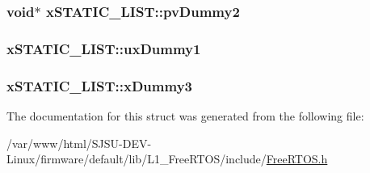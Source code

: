 \subsubsection[{\texorpdfstring{pv\+Dummy2}{pvDummy2}}]{\setlength{\rightskip}{0pt plus 5cm}void$\ast$ x\+S\+T\+A\+T\+I\+C\+\_\+\+L\+I\+S\+T\+::pv\+Dummy2}\hypertarget{structxSTATIC__LIST_a681e588716be5f49fe8e9eb73e8f280e}{}\label{structxSTATIC__LIST_a681e588716be5f49fe8e9eb73e8f280e}
\subsubsection[{\texorpdfstring{ux\+Dummy1}{uxDummy1}}]{ x\+S\+T\+A\+T\+I\+C\+\_\+\+L\+I\+S\+T\+::ux\+Dummy1}\hypertarget{structxSTATIC__LIST_a6d7f720dc21e3a676b885b72a945fea7}{}\label{structxSTATIC__LIST_a6d7f720dc21e3a676b885b72a945fea7}
\subsubsection[{\texorpdfstring{x\+Dummy3}{xDummy3}}]{ x\+S\+T\+A\+T\+I\+C\+\_\+\+L\+I\+S\+T\+::x\+Dummy3}\hypertarget{structxSTATIC__LIST_a232545ebb5629617e0ee6ba286e37788}{}\label{structxSTATIC__LIST_a232545ebb5629617e0ee6ba286e37788}


The documentation for this struct was generated from the following file\+:\begin{DoxyCompactItemize}
\item 
/var/www/html/\+S\+J\+S\+U-\/\+D\+E\+V-\/\+Linux/firmware/default/lib/\+L1\+\_\+\+Free\+R\+T\+O\+S/include/\hyperlink{FreeRTOS_8h}{Free\+R\+T\+O\+S.\+h}\end{DoxyCompactItemize}
